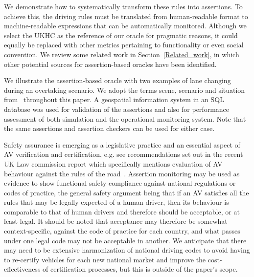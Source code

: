 %
We demonstrate how to systematically transform these rules into assertions. To achieve this, the driving rules must be translated from human-readable format to machine-readable expressions that can be automatically monitored. %
Although we select the UKHC as the reference of our oracle for pragmatic reasons, it could equally be replaced with other metrics pertaining to functionality or even social convention. We review some related work in Section~\ref{Related_work}, in which other potential sources for assertion-based oracles have been identified.
%
%

%
We illustrate the %
assertion-based oracle with two examples of %
lane changing during an overtaking scenario. We adopt the terms scene, scenario and situation from~\cite{Ulbrich2015} throughout this paper. 
A geospatial information system in an SQL database was used for validation of the assertions and also for performance assessment of both simulation and the operational monitoring system. Note that the same assertions and assertion checkers can be used for either case.
%


Safety assurance is emerging as a legislative practice and an essential aspect of AV verification and certification, e.g. see recommendations set out in the recent UK Law commission report which specifically mentions evaluation of AV behaviour against the rules of the road~\cite{law_commission_UK}. 
%
Assertion monitoring may be used as evidence to show functional safety compliance against national regulations or codes of practice, the general safety argument being that if an AV satisfies all the rules that may be legally expected of a human driver, then its behaviour is comparable to that of human drivers and therefore should be acceptable, or at least legal. It should be noted that acceptance may therefore be somewhat context-specific, against the code of practice for each country, and what passes under one legal code may not be acceptable in another. 
% 
We anticipate that there may need to be extensive harmonization of national driving codes to avoid having to re-certify vehicles for each new national market and improve the cost-effectiveness of certification processes, but this is outside of the paper's scope.

